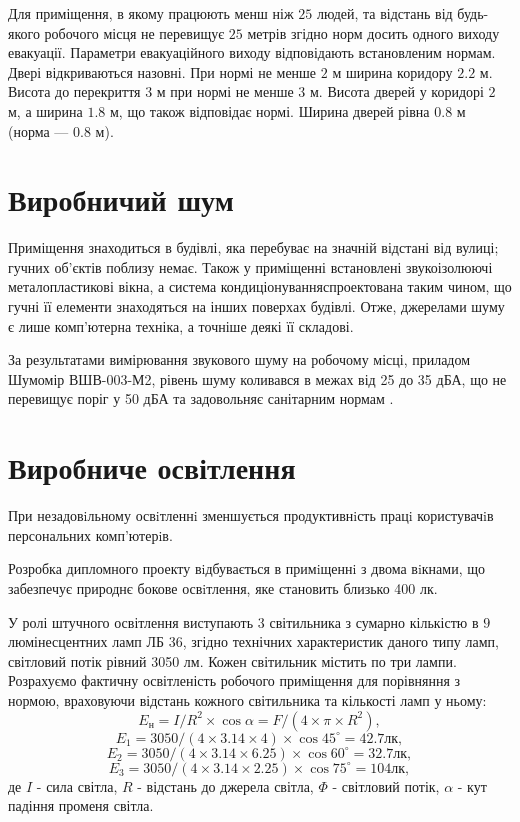 Для приміщення, в якому працюють менш ніж $25$ людей, та відстань від будь-якого
робочого місця не перевищує $25$ метрів згідно норм досить одного виходу
евакуації. Параметри евакуаційного виходу відповідають встановленим нормам.
Двері відкриваються назовні.
При нормі не менше $2$ м ширина коридору $2.2$ м.
Висота до перекриття $3$ м при нормі не менше $3$ м.
Висота дверей у коридорі $2$ м, а ширина $1.8$ м, що також відповідає нормі.
Ширина дверей рівна $0.8$ м  (норма --- $0.8$ м).

\section{Виробничий шум}

Приміщення знаходиться в будівлі, яка перебуває на значній відстані від вулиці;
гучних об’єктів поблизу немає.
Також у приміщенні встановлені звукоізолюючі металопластикові вікна,
а система кондиціонуванняспроектована таким чином,
що гучні її елементи знаходяться на інших поверхах будівлі.
Отже, джерелами шуму є лише комп’ютерна техніка, а точніше деякі її складові.

За результатами вимірювання звукового шуму на робочому місці,
приладом Шумомір ВШВ-003-М2, рівень шуму коливався в межах від 25 до 35 дБА, 
що не перевищує поріг у 50 дБА та задовольняє санітарним нормам \cite{DSanPiN}.

\section{Виробниче освітлення}

При незадовiльному освiтленнi зменшується продуктивнiсть працi
користувачiв персональних комп’ютерiв.

Розробка дипломного проекту вiдбувається в примiщеннi з двома вiкнами,
що забезпечує природнє бокове освiтлення, яке становить близько 400 лк.

У ролі штучного освітлення виступають $3$ світильника з сумарно кількістю в
$9$ люмінесцентних ламп ЛБ 36, згідно технічних характеристик даного типу ламп,
світловий потік рівний 3050 лм.
Кожен світильник містить по три  лампи. 
Розрахуємо фактичну освітленість робочого приміщення для порівняння з нормою,
враховуючи відстань кожного світильника та кількості ламп у ньому:
\begin{equation*}
  E_{\text{н}} = I/R^{2} \times \cos\alpha = F/(4 \times \pi \times R^{2} ),
\end{equation*}
\begin{equation*}
  E_{1} = 3050/(4\times 3.14\times 4)\times \cos{45^{\circ}} = 42.7 \text{лк},
\end{equation*}
\begin{equation*}
  E_{2} = 3050/(4\times 3.14\times 6.25)\times \cos{60^{\circ}} = 32.7\text{лк},
\end{equation*}
\begin{equation*}
  E_{3} = 3050/(4\times 3.14\times 2.25)\times \cos{75^{\circ}} = 104 \text{лк},
\end{equation*}
де $I$ - сила світла, $R$ - відстань до джерела світла, 
$\Phi$ - світловий потік, $\alpha$ - кут падіння променя світла.

